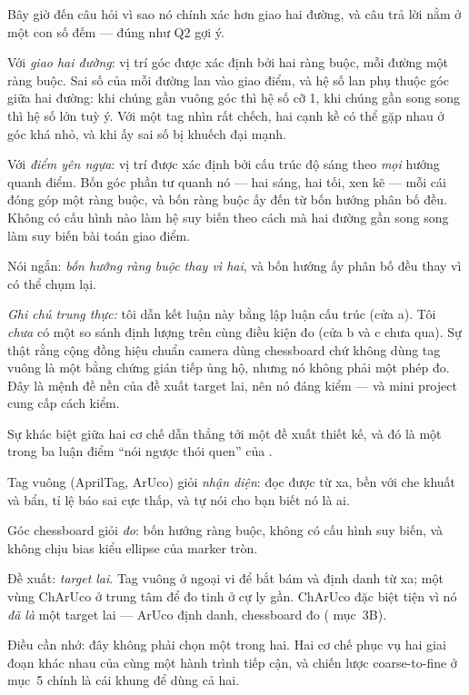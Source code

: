 \documentclass[../../marker.tex]{subfiles}
\begin{document}
Bây giờ đến câu hỏi vì sao nó chính xác hơn giao hai đường, và câu trả lời nằm ở một con số đếm --- đúng như Q2 gợi ý.

Với \emph{giao hai đường}: vị trí góc được xác định bởi hai ràng buộc, mỗi đường một ràng buộc. Sai số của mỗi đường lan vào giao điểm, và hệ số lan phụ thuộc góc giữa hai đường: khi chúng gần vuông góc thì hệ số cỡ 1, khi chúng gần song song thì hệ số lớn tuỳ ý. Với một tag nhìn rất chếch, hai cạnh kề có thể gặp nhau ở góc khá nhỏ, và khi ấy sai số bị khuếch đại mạnh.

Với \emph{điểm yên ngựa}: vị trí được xác định bởi cấu trúc độ sáng theo \emph{mọi} hướng quanh điểm. Bốn góc phần tư quanh nó --- hai sáng, hai tối, xen kẽ --- mỗi cái đóng góp một ràng buộc, và bốn ràng buộc ấy đến từ bốn hướng phân bố đều. Không có cấu hình nào làm hệ suy biến theo cách mà hai đường gần song song làm suy biến bài toán giao điểm.

Nói ngắn: \emph{bốn hướng ràng buộc thay vì hai}, và bốn hướng ấy phân bố đều thay vì có thể chụm lại.

\emph{Ghi chú trung thực:} tôi dẫn kết luận này bằng lập luận cấu trúc (cửa a). Tôi \emph{chưa} có một so sánh định lượng trên cùng điều kiện đo (cửa b và c chưa qua). Sự thật rằng cộng đồng hiệu chuẩn camera dùng chessboard chứ không dùng tag vuông là một bằng chứng gián tiếp ủng hộ, nhưng nó không phải một phép đo. Đây là mệnh đề nền của đề xuất target lai, nên nó đáng kiểm --- và mini project cung cấp cách kiểm.

\begin{cannho}
Sự khác biệt giữa hai cơ chế dẫn thẳng tới một đề xuất thiết kế, và đó là một trong ba luận điểm ``nói ngược thói quen'' của .

Tag vuông (AprilTag, ArUco) giỏi \emph{nhận diện}: đọc được từ xa, bền với che khuất và bẩn, tỉ lệ báo sai cực thấp, và tự nói cho bạn biết nó là ai.

Góc chessboard giỏi \emph{đo}: bốn hướng ràng buộc, không có cấu hình suy biến, và không chịu bias kiểu ellipse của marker tròn.

Đề xuất: \emph{target lai}. Tag vuông ở ngoại vi để bắt bám và định danh từ xa; một vùng ChArUco ở trung tâm để đo tinh ở cự ly gần. ChArUco đặc biệt tiện vì nó \emph{đã là} một target lai --- ArUco định danh, chessboard đo ( mục~3B).

Điều cần nhớ: đây không phải chọn một trong hai. Hai cơ chế phục vụ hai giai đoạn khác nhau của cùng một hành trình tiếp cận, và chiến lược coarse-to-fine ở  mục~5 chính là cái khung để dùng cả hai.
\end{cannho}
\end{document}
